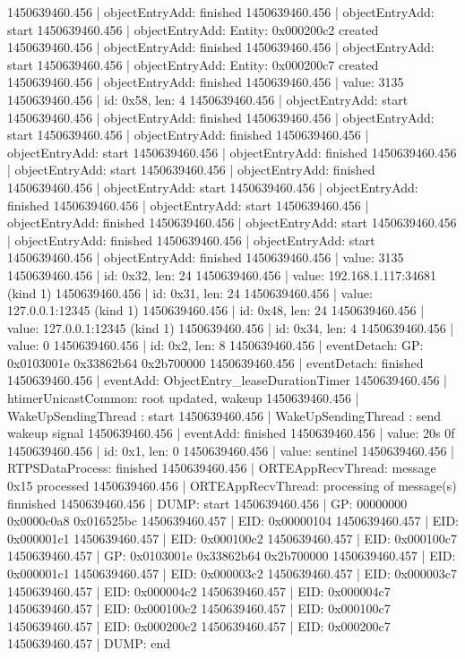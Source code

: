 1450639460.456 | objectEntryAdd: finished
1450639460.456 | objectEntryAdd: start
1450639460.456 | objectEntryAdd: Entity: 0x000200c2 created
1450639460.456 | objectEntryAdd: finished
1450639460.456 | objectEntryAdd: start
1450639460.456 | objectEntryAdd: Entity: 0x000200c7 created
1450639460.456 | objectEntryAdd: finished
1450639460.456 |   value: 3135
1450639460.456 |   id: 0x58, len: 4
1450639460.456 | objectEntryAdd: start
1450639460.456 | objectEntryAdd: finished
1450639460.456 | objectEntryAdd: start
1450639460.456 | objectEntryAdd: finished
1450639460.456 | objectEntryAdd: start
1450639460.456 | objectEntryAdd: finished
1450639460.456 | objectEntryAdd: start
1450639460.456 | objectEntryAdd: finished
1450639460.456 | objectEntryAdd: start
1450639460.456 | objectEntryAdd: finished
1450639460.456 | objectEntryAdd: start
1450639460.456 | objectEntryAdd: finished
1450639460.456 | objectEntryAdd: start
1450639460.456 | objectEntryAdd: finished
1450639460.456 | objectEntryAdd: start
1450639460.456 | objectEntryAdd: finished
1450639460.456 |   value: 3135
1450639460.456 |   id: 0x32, len: 24
1450639460.456 |   value: 192.168.1.117:34681 (kind 1)
1450639460.456 |   id: 0x31, len: 24
1450639460.456 |   value: 127.0.0.1:12345 (kind 1)
1450639460.456 |   id: 0x48, len: 24
1450639460.456 |   value: 127.0.0.1:12345 (kind 1)
1450639460.456 |   id: 0x34, len: 4
1450639460.456 |   value: 0
1450639460.456 |   id: 0x2, len: 8
1450639460.456 | eventDetach: GP: 0x0103001e 0x33862b64 0x2b700000
1450639460.456 | eventDetach: finished
1450639460.456 | eventAdd: ObjectEntry_leaseDurationTimer
1450639460.456 | htimerUnicastCommon: root updated, wakeup
1450639460.456 | WakeUpSendingThread : start
1450639460.456 | WakeUpSendingThread : send wakeup signal
1450639460.456 | eventAdd: finished
1450639460.456 |   value: 20s 0f
1450639460.456 |   id: 0x1, len: 0
1450639460.456 |   value: sentinel
1450639460.456 | RTPSDataProcess: finished
1450639460.456 | ORTEAppRecvThread: message 0x15 processed
1450639460.456 | ORTEAppRecvThread: processing of message(s) finnished
1450639460.456 | DUMP: start
1450639460.456 | GP:   00000000 0x0000c0a8 0x016525bc
1450639460.457 |   EID: 0x00000104
1450639460.457 |   EID: 0x000001c1
1450639460.457 |   EID: 0x000100c2
1450639460.457 |   EID: 0x000100c7
1450639460.457 | GP: 0x0103001e 0x33862b64 0x2b700000
1450639460.457 |   EID: 0x000001c1
1450639460.457 |   EID: 0x000003c2
1450639460.457 |   EID: 0x000003c7
1450639460.457 |   EID: 0x000004c2
1450639460.457 |   EID: 0x000004c7
1450639460.457 |   EID: 0x000100c2
1450639460.457 |   EID: 0x000100c7
1450639460.457 |   EID: 0x000200c2
1450639460.457 |   EID: 0x000200c7
1450639460.457 | DUMP: end
\endtt

